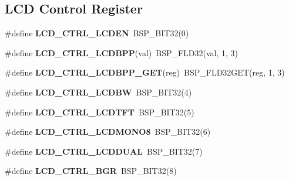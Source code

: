 \subsection*{L\+CD Control Register}
\begin{DoxyCompactItemize}
\item 
\mbox{\label{group__lpc__lcd_gac0a7d3a434edff4822fc7cbd51e75eeb}} 
\#define {\bfseries L\+C\+D\+\_\+\+C\+T\+R\+L\+\_\+\+L\+C\+D\+EN}~B\+S\+P\+\_\+\+B\+I\+T32(0)
\item 
\mbox{\label{group__lpc__lcd_gae145788a132061785d6d753e5f7c3af3}} 
\#define {\bfseries L\+C\+D\+\_\+\+C\+T\+R\+L\+\_\+\+L\+C\+D\+B\+PP}(val)~B\+S\+P\+\_\+\+F\+L\+D32(val, 1, 3)
\item 
\mbox{\label{group__lpc__lcd_gac4418ab6a34d0cc9574ad6661870eb7a}} 
\#define {\bfseries L\+C\+D\+\_\+\+C\+T\+R\+L\+\_\+\+L\+C\+D\+B\+P\+P\+\_\+\+G\+ET}(reg)~B\+S\+P\+\_\+\+F\+L\+D32\+G\+ET(reg, 1, 3)
\item 
\mbox{\label{group__lpc__lcd_gab9a51e08a501d844f729f97d74303508}} 
\#define {\bfseries L\+C\+D\+\_\+\+C\+T\+R\+L\+\_\+\+L\+C\+D\+BW}~B\+S\+P\+\_\+\+B\+I\+T32(4)
\item 
\mbox{\label{group__lpc__lcd_ga8a1044473f0e161f589238ef623207a6}} 
\#define {\bfseries L\+C\+D\+\_\+\+C\+T\+R\+L\+\_\+\+L\+C\+D\+T\+FT}~B\+S\+P\+\_\+\+B\+I\+T32(5)
\item 
\mbox{\label{group__lpc__lcd_ga544c32fea787b4ed84431b3095f6acdd}} 
\#define {\bfseries L\+C\+D\+\_\+\+C\+T\+R\+L\+\_\+\+L\+C\+D\+M\+O\+N\+O8}~B\+S\+P\+\_\+\+B\+I\+T32(6)
\item 
\mbox{\label{group__lpc__lcd_ga3e342f28f30f526800e74ac039ec2181}} 
\#define {\bfseries L\+C\+D\+\_\+\+C\+T\+R\+L\+\_\+\+L\+C\+D\+D\+U\+AL}~B\+S\+P\+\_\+\+B\+I\+T32(7)
\item 
\mbox{\label{group__lpc__lcd_ga4e1797e949e125938bb4383ef0465c34}} 
\#define {\bfseries L\+C\+D\+\_\+\+C\+T\+R\+L\+\_\+\+B\+GR}~B\+S\+P\+\_\+\+B\+I\+T32(8)
\item 
\mbox{\label{group__lpc__lcd_gacf4e18c12573746c256de5b3d2fc1a0c}} 

\end{DoxyCompactItemize}
